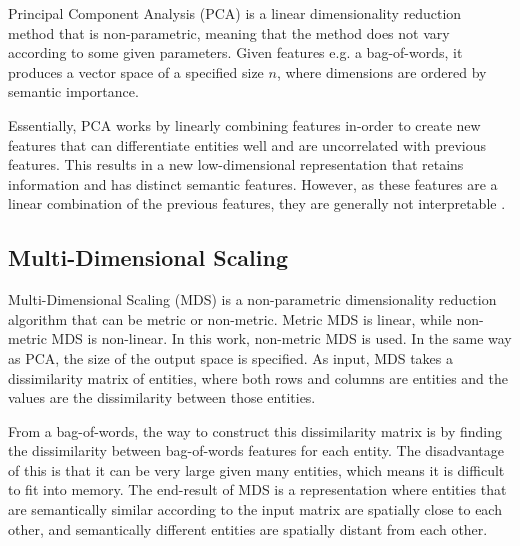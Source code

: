 

Principal Component Analysis (PCA) is a linear dimensionality reduction method that is non-parametric, meaning that the method does not vary according to some given parameters. Given features e.g.  a bag-of-words, it produces a vector space of a specified size $n$, where dimensions are  ordered by semantic importance. 

Essentially, PCA works by linearly combining features in-order to create new features that can differentiate entities well and are uncorrelated with previous features. This results in a new low-dimensional representation that retains information and has distinct semantic features. However, as these features are a linear combination of the previous features, they are generally not interpretable \cite{Gimenez}. 


\subsection{Multi-Dimensional Scaling}\label{ch2:MDS}


Multi-Dimensional Scaling  (MDS) is a non-parametric dimensionality reduction algorithm that can be metric  or non-metric. Metric MDS is linear, while non-metric MDS is non-linear. In this work, non-metric MDS is used. In the same way as PCA, the size of the output space is specified. As input, MDS takes a dissimilarity matrix of entities, where both rows and columns are entities and the values are the dissimilarity between those entities. 

From a bag-of-words, the way to construct this dissimilarity matrix is by finding the dissimilarity between bag-of-words features for each entity. The disadvantage of this is that it can be very large given many entities, which means it is difficult to fit into memory. The end-result of MDS is a representation where entities that are semantically similar according to the input matrix are spatially close to each other, and semantically different entities are spatially distant from each other.




